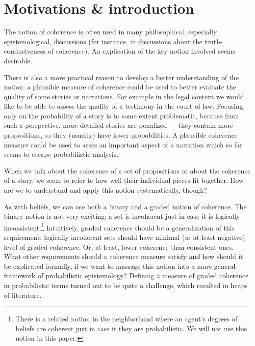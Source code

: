 \documentclass[10pt,]{scrartcl}
\begin{document}
\section{Motivations \& introduction}

The notion of coherence is often used in many philosophical, especially
epistemological, discussions (for instance, in discussions about the
truth-conduciveness of coherence). An explication of the key notion
involved seems desirable.

There is also a more practical reason to develop a better understanding
of the notion: a plausible measure of coherence could be used to better
evaluate the quality of some stories or narrations. For example in the
legal context we would like to be able to assess the quality of a
testimony in the court of law. Focusing only on the probability of a
story is to some extent problematic, because from such a perspective,
more detailed stories are penalized --- they contain more propositions,
so they (usually) have lower probabilities. A plausible coherence
measure could be used to asses an important aspect of a narration which
so far seems to escape probabilistic analysis.

When we talk about the coherence of a set of propositions or about the
coherence of a story, we seem to refer to how well their individual
pieces fit together. How are we to understand and apply this notion
systematically, though?

As with beliefs, we can use both a binary and a graded notion of
coherence. The binary notion is not very exciting: a set is incoherent
just in case it is logically
inconsistent.\footnote{There is a related notion in the neighborhood where an agent's  degrees of beliefs are coherent just in case it they are probabilistic. We will not use this notion in this paper.}
Intuitively, graded coherence should be a generalization of this
requirement: logically incoherent sets should have minimal (or at least
negative) level of graded coherence. Or, at least, lower coherence than
consistent ones. What other requirements should a coherence measure
satisfy and how should it be explicated formally, if we want to massage
this notion into a more general framework of probabilistic epistemology?
Defining a measure of graded coherence in probabilistic terms turned out
to be quite a challenge, which resulted in heaps of literature.
\end{document}

